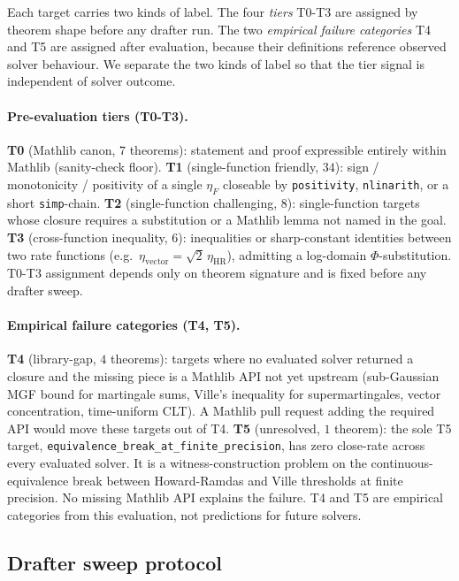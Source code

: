 Each target carries two kinds of label. The four \emph{tiers} T0-T3
are assigned by theorem shape before any drafter run. The two
\emph{empirical failure categories} T4 and T5 are assigned
after evaluation, because their definitions reference observed
solver behaviour. We separate the two kinds of label so that the
tier signal is independent of solver outcome.

\paragraph{Pre-evaluation tiers (T0-T3).}
\textbf{T0} (Mathlib canon, $7$ theorems): statement and proof
expressible entirely within Mathlib (sanity-check floor).
\textbf{T1} (single-function friendly, $34$): sign /
monotonicity / positivity of a single $\eta_F$ closeable by
\texttt{positivity}, \texttt{nlinarith}, or a short
\texttt{simp}-chain.
\textbf{T2} (single-function challenging, $8$): single-function
targets whose closure requires a substitution or a Mathlib
lemma not named in the goal.
\textbf{T3} (cross-function inequality, $6$): inequalities
or sharp-constant identities between two rate functions (e.g.\
$\eta_{\mathrm{vector}} = \sqrt{2}\,\eta_{\mathrm{HR}}$),
admitting a log-domain $\Phi$-substitution. T0-T3 assignment
depends only on theorem signature and is fixed before any
drafter sweep.

\paragraph{Empirical failure categories (T4, T5).}
\textbf{T4} (library-gap, $4$ theorems): targets where no
evaluated solver returned a closure and the missing piece is a
Mathlib API not yet upstream (sub-Gaussian MGF bound for
martingale sums, Ville's inequality for supermartingales,
vector concentration, time-uniform CLT). A Mathlib pull request
adding the required API would move these targets out of T4.
\textbf{T5} (unresolved, $1$ theorem): the sole T5 target,
\texttt{equivalence\_\allowbreak break\_at\_\allowbreak finite\_precision}, has zero
close-rate across every evaluated solver. It is a
witness-construction problem on the continuous-equivalence
break between Howard-Ramdas and Ville thresholds at finite
precision. No missing Mathlib API explains the failure.
T4 and T5 are empirical categories from this evaluation, not predictions for future solvers.

\subsection{Drafter sweep protocol}


